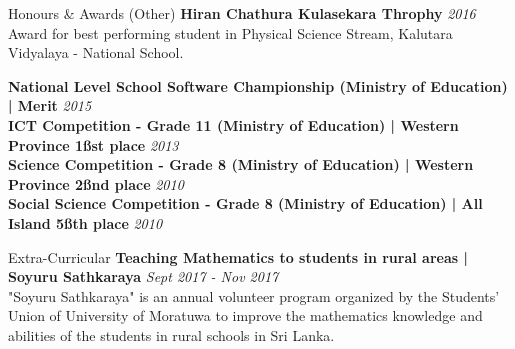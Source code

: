 \documentclass{cv}
\begin{document}
\begin{rSection}{Honours \& Awards (Other)}
    {\bf Hiran Chathura Kulasekara Throphy}                                                         \hfill {\em 2016}
    \\Award for best performing student in Physical Science Stream, Kalutara Vidyalaya - National School.\par
    {\bf National Level School Software Championship (Ministry of Education) | Merit}               \hfill {\em 2015}\\
    {\bf ICT Competition - Grade 11 (Ministry of Education) | Western Province 1\ss{st} place}      \hfill {\em 2013}\\
    {\bf Science Competition - Grade 8 (Ministry of Education) | Western Province 2\ss{nd} place}   \hfill {\em 2010}\\
    {\bf Social Science Competition - Grade 8 (Ministry of Education) | All Island 5\ss{th} place}  \hfill {\em 2010}
\end{rSection}


\begin{rSection}{Extra-Curricular}
    {\bf Teaching Mathematics to students in rural areas | Soyuru Sathkaraya}       \hfill {\em Sept 2017 - Nov 2017}
    \\"Soyuru Sathkaraya" is an annual volunteer program organized by the Students' Union of University of Moratuwa to improve the mathematics knowledge and abilities of the students in rural schools in Sri Lanka.
\end{rSection}

\end{document}
